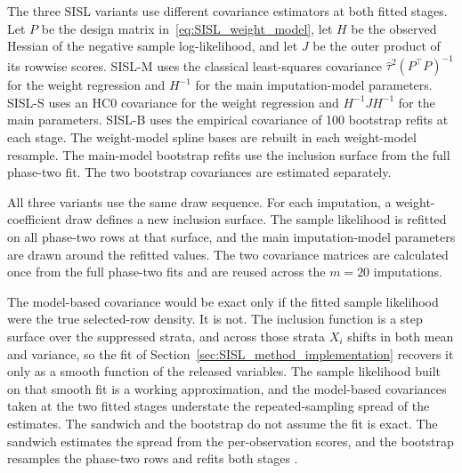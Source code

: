 The three SISL variants use different covariance estimators at both fitted stages. Let $P$ be the design matrix in~\eqref{eq:SISL_weight_model}, let $H$ be the observed Hessian of the negative sample log-likelihood, and let $J$ be the outer product of its rowwise scores. SISL-M uses the classical least-squares covariance $\hat\tau^2(P^\top P)^{-1}$ for the weight regression and $H^{-1}$ for the main imputation-model parameters. SISL-S uses an HC0 covariance for the weight regression and $H^{-1}JH^{-1}$ for the main parameters. SISL-B uses the empirical covariance of 100 bootstrap refits at each stage. The weight-model spline bases are rebuilt in each weight-model resample. The main-model bootstrap refits use the inclusion surface from the full phase-two fit. The two bootstrap covariances are estimated separately.

All three variants use the same draw sequence. For each imputation, a weight-coefficient draw defines a new inclusion surface. The sample likelihood is refitted on all phase-two rows at that surface, and the main imputation-model parameters are drawn around the refitted values. The two covariance matrices are calculated once from the full phase-two fits and are reused across the $m=20$ imputations.

The model-based covariance would be exact only if the fitted sample likelihood were the true selected-row density. It is not. The inclusion function is a step surface over the suppressed strata, and across those strata $X_i$ shifts in both mean and variance, so the fit of Section~\ref{sec:SISL_method_implementation} recovers it only as a smooth function of the released variables. The sample likelihood built on that smooth fit is a working approximation, and the model-based covariances taken at the two fitted stages understate the repeated-sampling spread of the estimates. The sandwich and the bootstrap do not assume the fit is exact. The sandwich estimates the spread from the per-observation scores, and the bootstrap resamples the phase-two rows and refits both stages \citep{huber1967behavior,white1982maximum}.

